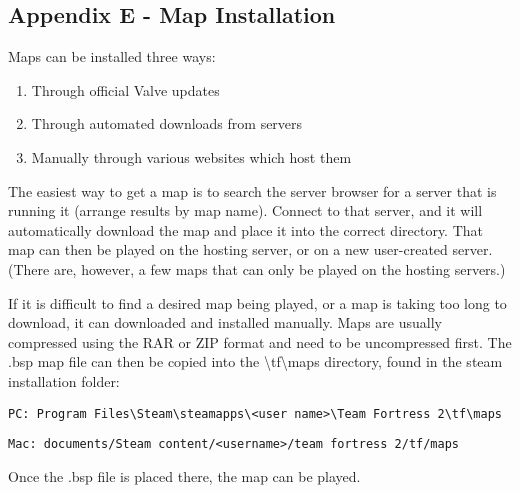 \subsection{Appendix E - Map Installation}
\label{map_install}
Maps can be installed three ways:
\begin{enumerate}
  \setlength{\itemsep}{1pt}
  \setlength{\parskip}{0pt}
  \setlength{\parsep}{0pt}
  \item Through official Valve updates
  \item Through automated downloads from servers
  \item Manually through various websites which host them
\end{enumerate}


The easiest way to get a map is to search the server browser for a server that is running it (arrange results by map name). Connect to that server, and it will automatically download the map and place it into the correct directory. That map can then be played on the hosting server, or on a new user-created server.  (There are, however, a few maps that can only be played on the hosting servers.)

If it is difficult to find a desired map being played, or a map is taking too long to download, it can downloaded and installed manually. Maps are usually compressed using the RAR or ZIP format and need to be uncompressed first.  The .bsp map file can then be copied into the \textbackslash tf\textbackslash maps directory, found in the steam installation folder:
\begin{lstlisting}
PC: Program Files\Steam\steamapps\<user name>\Team Fortress 2\tf\maps
\end{lstlisting}
\begin{lstlisting}
Mac: documents/Steam content/<username>/team fortress 2/tf/maps
\end{lstlisting}
Once the .bsp file is placed there, the map can be played.